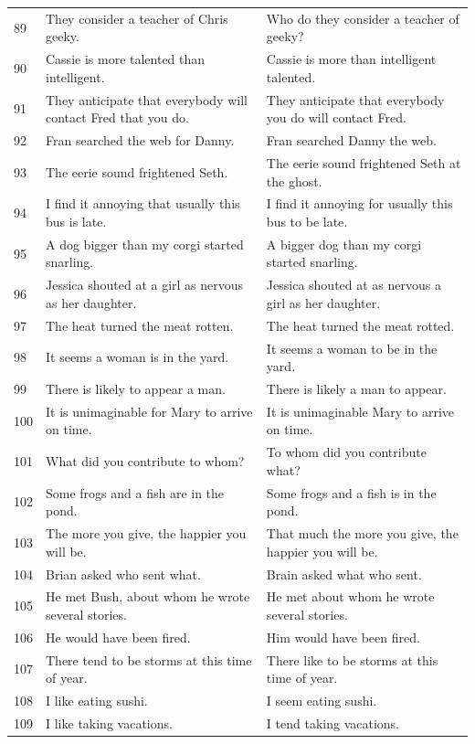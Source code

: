 \documentclass[doc]{apa6}
\begin{document}
\begin{small}
\begin{longtable}{p{1cm} | p{8.5cm} | p{8.5cm}}
89 & They consider a teacher of Chris geeky. & Who do they consider a teacher of geeky?\\
90 & Cassie is more talented than intelligent. & Cassie is more than intelligent talented.\\
91 & They anticipate that everybody will contact Fred that you do. & They anticipate that everybody you do will contact Fred.\\
92 & Fran searched the web for Danny. & Fran searched Danny the web.\\
93 & The eerie sound frightened Seth. & The eerie sound frightened Seth at the ghost.\\
94 & I find it annoying that usually this bus is late. & I find it annoying for usually this bus to be late.\\
95 & A dog bigger than my corgi started snarling. & A bigger dog than my corgi started snarling.\\
96 & Jessica shouted at a girl as nervous as her daughter. & Jessica shouted at as nervous a girl as her daughter.\\
97 & The heat turned the meat rotten. & The heat turned the meat rotted.\\
98 & It seems a woman is in the yard. & It seems a woman to be in the yard.\\
99 & There is likely to appear a man. & There is likely a man to appear.\\
100 & It is unimaginable for Mary to arrive on time. & It is unimaginable Mary to arrive on time.\\
101 & What did you contribute to whom? & To whom did you contribute what?\\
102 & Some frogs and a fish are in the pond. & Some frogs and a fish is in the pond.\\
103 & The more you give, the happier you will be. & That much the more you give, the happier you will be.\\
104 & Brian asked who sent what. & Brain asked what who sent.\\
105 & He met Bush, about whom he wrote several stories. & He met about whom he wrote several stories.\\
106 & He would have been fired. & Him would have been fired.\\
107 & There tend to be storms at this time of year.  & There like to be storms at this time of year.\\
108 & I like eating sushi.  & I seem eating sushi.\\
109 & I like taking vacations. & I tend taking vacations.\\

\end{longtable}
\end{small}
\end{document}
